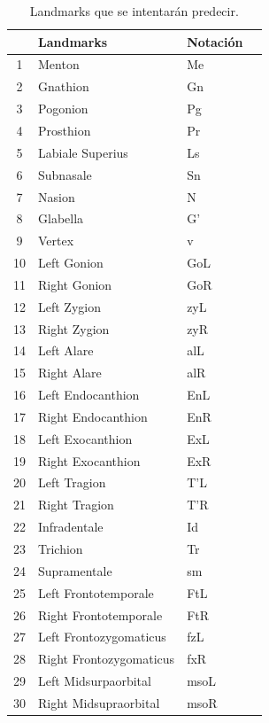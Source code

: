     \begin{table}
        \centering
        \caption{Landmarks que se intentarán predecir.}
        \begin{tabular}{ |c|l|l|c| } 
            \hline
            & \cellcolor{gray!25}\textbf{Landmarks} & \cellcolor{gray!25}\textbf{Notación} \\
            \hline
            1 & Menton & Me \\ 
            2 & Gnathion & Gn \\ 
            3 & Pogonion & Pg \\ 
            4 & Prosthion & Pr \\ 
            5 & Labiale Superius & Ls \\ 
            6 & Subnasale & Sn \\ 
            7 & Nasion & N \\ 
            8 & Glabella & G’ \\ 
            9 & Vertex & v \\ 
            10 & Left Gonion & GoL \\ 
            11 & Right Gonion & GoR\\ 
            12 & Left Zygion & zyL \\ 
            13 & Right Zygion & zyR\\ 
            14 & Left Alare & alL \\ 
            15 & Right Alare & alR \\ 
            16 & Left Endocanthion & EnL \\ 
            17 & Right Endocanthion & EnR \\ 
            18 & Left Exocanthion & ExL \\ 
            19 & Right Exocanthion & ExR \\ 
            20 & Left Tragion & T’L \\ 
            21 & Right Tragion & T’R \\ 
            22 & Infradentale & Id \\ 
            23 & Trichion & Tr \\ 
            24 & Supramentale & sm\\ 
            25 & Left Frontotemporale & FtL \\ 
            26 & Right Frontotemporale & FtR \\ 
            27 & Left Frontozygomaticus & fzL \\ 
            28 & Right Frontozygomaticus & fxR \\ 
            29 & Left Midsurpaorbital & msoL \\ 
            30 & Right Midsupraorbital & msoR \\ 
            \hline
        \end{tabular}
        \label{table:tabla_landmarks}
    \end{table}


